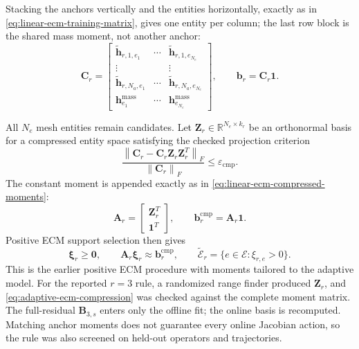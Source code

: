 \documentclass[11pt]{article}
\newcommand{\norm}[1]{\left\lVert #1 \right\rVert}
\begin{document}
\begin{samepage}
Stacking the anchors vertically and the
entities horizontally, exactly as in
\eqref{eq:linear-ecm-training-matrix}, gives one entity per column; the
last row block is the shared mass moment, not another anchor:
\begin{equation}
\mathbf C_r=
\begin{bmatrix}
\widetilde{\mathbf h}_{r,1,e_1}&\cdots&
\widetilde{\mathbf h}_{r,1,e_{N_e}}\\
\vdots&&\vdots\\
\widetilde{\mathbf h}_{r,N_a,e_1}&\cdots&
\widetilde{\mathbf h}_{r,N_a,e_{N_e}}\\
\mathbf h_{e_1}^{\mathrm{mass}}&\cdots&
\mathbf h_{e_{N_e}}^{\mathrm{mass}}
\end{bmatrix},
\qquad
\mathbf b_r=\mathbf C_r\mathbf1.
\label{eq:adaptive-ecm-matrix}
\end{equation}
\end{samepage}
All $N_e$ mesh entities remain candidates.  Let
$\mathbf Z_r\in\mathbb R^{N_e\times k_r}$ be an orthonormal basis for a
compressed entity space satisfying the checked projection criterion
\begin{equation}
\frac{\norm{\mathbf C_r-\mathbf C_r\mathbf Z_r\mathbf Z_r^T}_F}
{\norm{\mathbf C_r}_F}\leq\varepsilon_{\mathrm{cmp}}.
\label{eq:adaptive-ecm-compression}
\end{equation}
The constant moment is appended exactly as in
\eqref{eq:linear-ecm-compressed-moments}:
\begin{equation}
\mathbf A_r=\begin{bmatrix}\mathbf Z_r^T\\\mathbf1^T\end{bmatrix},
\qquad
\mathbf b_r^{\mathrm{cmp}}=\mathbf A_r\mathbf1.
\label{eq:adaptive-ecm-compressed-moments}
\end{equation}
Positive ECM support selection then gives
\begin{equation}
\boldsymbol\xi_r\geq\mathbf0,
\qquad
\mathbf A_r\boldsymbol\xi_r\approx\mathbf b_r^{\mathrm{cmp}},
\qquad
\widetilde{\mathcal E}_r=
\{e\in\mathcal E:\xi_{r,e}>0\}.
\label{eq:adaptive-ecm-rule}
\end{equation}
This is the earlier positive ECM procedure with moments tailored to the
adaptive model.  For the reported $r=3$ rule, a randomized range finder
produced $\mathbf Z_r$, and \eqref{eq:adaptive-ecm-compression} was checked
against the complete moment matrix.  The full-residual $\mathbf B_{3,s}$
enters only the offline fit; the online basis is recomputed.  Matching
anchor moments does not guarantee every online Jacobian action, so the
rule was also screened on held-out operators and trajectories.
\end{document}
